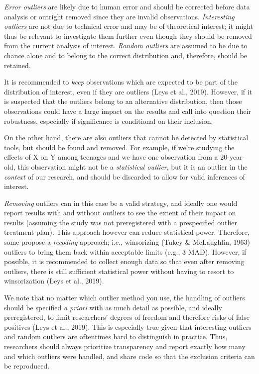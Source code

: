 \documentclass[
]{article}
\begin{document}
\emph{Error outliers} are likely due to human error and should be
corrected before data analysis or outright removed since they are
invalid observations. \emph{Interesting outliers} are not due to
technical error and may be of theoretical interest; it might thus be
relevant to investigate them further even though they should be removed
from the current analysis of interest. \emph{Random outliers} are
assumed to be due to chance alone and to belong to the correct
distribution and, therefore, should be retained.

It is recommended to \emph{keep} observations which are expected to be
part of the distribution of interest, even if they are outliers (Leys et
al., 2019). However, if it is suspected that the outliers belong to an
alternative distribution, then those observations could have a large
impact on the results and call into question their robustness,
especially if significance is conditional on their inclusion.

On the other hand, there are also outliers that cannot be detected by
statistical tools, but should be found and removed. For example, if
we're studying the effects of X on Y among teenages and we have one
observation from a 20-year-old, this observation might not be a
\emph{statistical outlier}, but it is an outlier in the \emph{context}
of our research, and should be discarded to allow for valid inferences
of interest.

\emph{Removing} outliers can in this case be a valid strategy, and
ideally one would report results with and without outliers to see the
extent of their impact on results (assuming the study was not
preregistered with a prespecified outlier treatment plan). This approach
however can reduce statistical power. Therefore, some propose a
\emph{recoding} approach; i.e., winsorizing (Tukey \& McLaughlin, 1963)
outliers to bring them back within acceptable limits (e.g., 3 MAD).
However, if possible, it is recommended to collect enough data so that
even after removing outliers, there is still sufficient statistical
power without having to resort to winsorization (Leys et al., 2019).

We note that no matter which outlier method you use, the handling of
outliers should be specified \emph{a priori} with as much detail as
possible, and ideally preregistered, to limit researchers' degrees of
freedom and therefore risks of false positives (Leys et al., 2019). This
is especially true given that interesting outliers and random outliers
are oftentimes hard to distinguish in practice. Thus, researchers should
always prioritize transparency and report exactly how many and which
outliers were handled, and share code so that the exclusion criteria can
be reproduced.
\end{document}
